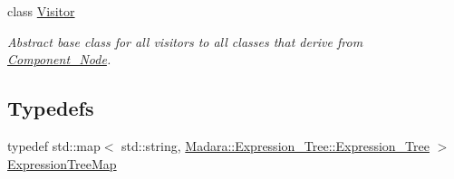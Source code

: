 \begin{DoxyCompactItemize}
class \hyperlink{classMadara_1_1Expression__Tree_1_1Visitor}{Visitor}
\begin{DoxyCompactList}\small\item\em Abstract base class for all visitors to all classes that derive from {\itshape \hyperlink{classMadara_1_1Expression__Tree_1_1Component__Node}{Component\_\-Node}\/}. \item\end{DoxyCompactList}\end{DoxyCompactItemize}
\subsection*{Typedefs}
\begin{DoxyCompactItemize}
\item 
typedef std::map$<$ std::string, \hyperlink{classMadara_1_1Expression__Tree_1_1Expression__Tree}{Madara::Expression\_\-Tree::Expression\_\-Tree} $>$ \hyperlink{namespaceMadara_1_1Expression__Tree_a788e8f51bae001516b9aec802d9decf5}{ExpressionTreeMap}
\end{DoxyCompactItemize}
